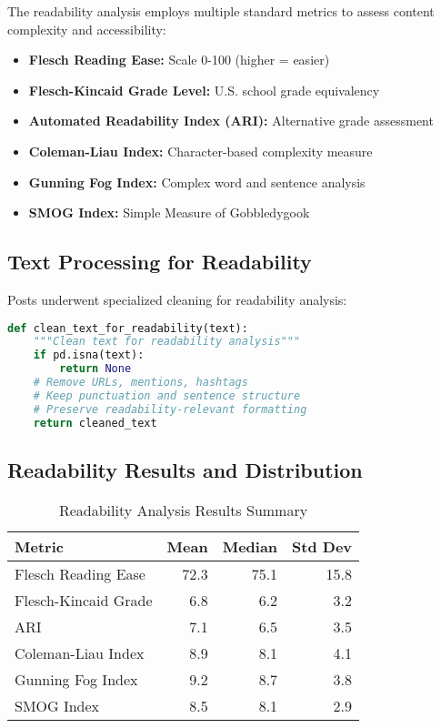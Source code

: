 \documentclass[12pt,a4paper]{article}
\begin{document}
The readability analysis employs multiple standard metrics to assess content complexity and accessibility:

\begin{itemize}
\item \textbf{Flesch Reading Ease:} Scale 0-100 (higher = easier)
\item \textbf{Flesch-Kincaid Grade Level:} U.S. school grade equivalency
\item \textbf{Automated Readability Index (ARI):} Alternative grade assessment
\item \textbf{Coleman-Liau Index:} Character-based complexity measure
\item \textbf{Gunning Fog Index:} Complex word and sentence analysis
\item \textbf{SMOG Index:} Simple Measure of Gobbledygook
\end{itemize}

\subsection{Text Processing for Readability}

Posts underwent specialized cleaning for readability analysis:
\begin{lstlisting}[language=Python, caption=Text Cleaning Process]
def clean_text_for_readability(text):
    """Clean text for readability analysis"""
    if pd.isna(text):
        return None
    # Remove URLs, mentions, hashtags
    # Keep punctuation and sentence structure
    # Preserve readability-relevant formatting
    return cleaned_text
\end{lstlisting}

\subsection{Readability Results and Distribution}

\begin{table}[H]
\centering
\caption{Readability Analysis Results Summary}
\begin{tabular}{@{}lrrr@{}}
\toprule
\textbf{Metric} & \textbf{Mean} & \textbf{Median} & \textbf{Std Dev} \\
\midrule
Flesch Reading Ease & 72.3 & 75.1 & 15.8 \\
Flesch-Kincaid Grade & 6.8 & 6.2 & 3.2 \\
ARI & 7.1 & 6.5 & 3.5 \\
Coleman-Liau Index & 8.9 & 8.1 & 4.1 \\
Gunning Fog Index & 9.2 & 8.7 & 3.8 \\
SMOG Index & 8.5 & 8.1 & 2.9 \\
\bottomrule
\end{tabular}
\end{table}
\end{document}
